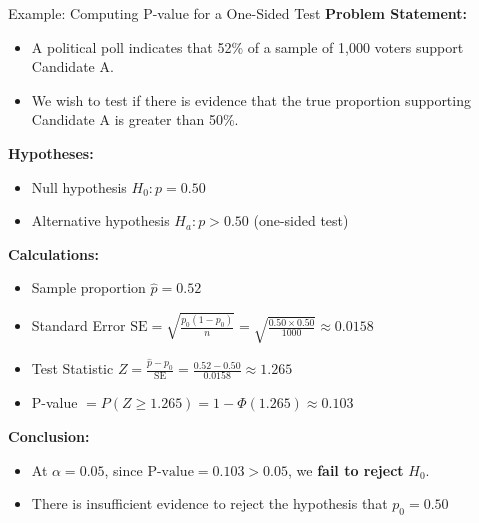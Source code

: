 \documentclass[handout]{beamer} %
\begin{document}
\begin{frame}{Example: Computing P-value for a One-Sided Test}
\footnotesize 
    \textbf{Problem Statement:}
    \begin{itemize}
        \item A political poll indicates that 52\% of a sample of 1,000 voters support Candidate A.
        \item We wish to test if there is evidence that the true proportion supporting Candidate A is greater than 50\%.
    \end{itemize}
    
    \textbf{Hypotheses:}
    \begin{itemize}
        \item Null hypothesis \( H_0: p = 0.50 \)
        \item Alternative hypothesis \( H_a: p > 0.50 \) (one-sided test)
    \end{itemize}
    
    \textbf{Calculations:}
    \begin{itemize}
        \item Sample proportion \( \hat{p} = 0.52 \)
        \item Standard Error \( \text{SE} = \sqrt{\frac{p_0 (1 - p_0)}{n}} = \sqrt{\frac{0.50 \times 0.50}{1000}} \approx 0.0158 \)
        \item Test Statistic \( Z = \frac{\hat{p} - p_0}{\text{SE}} = \frac{0.52 - 0.50}{0.0158} \approx 1.265 \)
        \item P-value \( = P(Z \geq 1.265) = 1 - \Phi(1.265) \approx 0.103 \)
    \end{itemize}
    
    \textbf{Conclusion:}
    \begin{itemize}
        \item At \( \alpha = 0.05 \), since \( \text{P-value} = 0.103 > 0.05 \), we \textbf{fail to reject} \( H_0 \).
        \item There is insufficient evidence to reject the hypothesis that $p_0 = 0.50$
    \end{itemize}
\end{frame}
\end{document}
